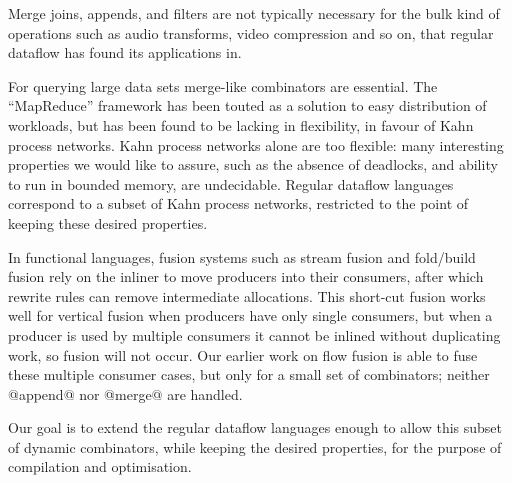 Merge joins, appends, and filters are not typically necessary for the bulk kind of operations such as audio transforms, video compression and so on, that regular dataflow has found its applications in\cite{johnston2004advances}.

For querying large data sets merge-like combinators are essential.
The ``MapReduce'' framework has been touted as a solution to easy distribution of workloads, but has been found to be lacking in flexibility\cite{vrba2009kahn}, in favour of Kahn process networks.
Kahn process networks alone are too flexible: many interesting properties we would like to assure, such as the absence of deadlocks, and ability to run in bounded memory, are undecidable.
Regular dataflow languages correspond to a subset of Kahn process networks, restricted to the point of keeping these desired properties\cite{thies2009language}.

In functional languages, fusion systems such as stream fusion\cite{coutts2007stream} and fold/build fusion\cite{jones2001playing} rely on the inliner to move producers into their consumers, after which rewrite rules can remove intermediate allocations.
This short-cut fusion works well for vertical fusion when producers have only single consumers, but when a producer is used by multiple consumers it cannot be inlined without duplicating work, so fusion will not occur.
Our earlier work on flow fusion\cite{lippmeier2013data} is able to fuse these multiple consumer cases, but only for a small set of combinators; neither @append@ nor @merge@ are handled.

Our goal is to extend the regular dataflow languages enough to allow this subset of dynamic combinators, while keeping the desired properties, for the purpose of compilation and optimisation.



